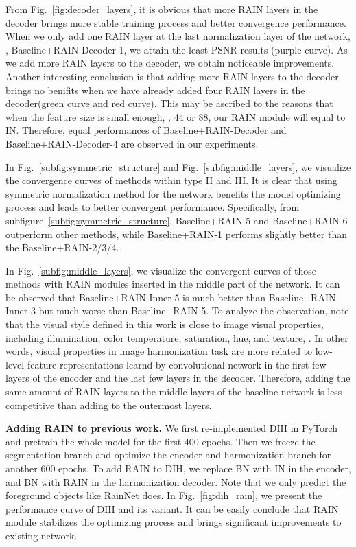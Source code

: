 \documentclass[final]{cvpr}
\begin{document}
From Fig.~\ref{fig:decoder_layers}, it is obvious that more RAIN layers in the decoder brings more stable training process and better convergence performance. When we only add one RAIN layer at the last normalization layer of the network, \ie, Baseline+RAIN-Decoder-1, we attain the least PSNR results (purple curve). As we add more RAIN layers to the decoder, we obtain noticeable improvements. Another interesting conclusion is that adding more RAIN layers to the decoder brings no benifits when we have already added four RAIN layers in the decoder(green curve and red curve). This may be ascribed to the reasons that when the feature size is small enough, \eg, 44 or 88, our RAIN module will equal to IN. Therefore, equal performances of Baseline+RAIN-Decoder and Baseline+RAIN-Decoder-4 are observed in our experiments.  

In Fig.~\ref{subfig:symmetric_structure} and Fig.~\ref{subfig:middle_layers}, we visualize the convergence curves of methods within type II and III. It is clear that using symmetric normalization method for the network benefits the model optimizing process and leads to better convergent performance. Specifically, from subfigure~\ref{subfig:symmetric_structure}, Baseline+RAIN-5 and Baseline+RAIN-6 outperform other methods, while Baseline+RAIN-1 performs slightly better than the Baseline+RAIN-2/3/4. 

In Fig.~\ref{subfig:middle_layers}, we visualize the convergent curves of those methods with RAIN modules inserted in the middle part of the network. It can be observed that Baseline+RAIN-Inner-5 is much better than Baseline+RAIN-Inner-3 but much worse than Baseline+RAIN-5. To analyze the observation, note that the visual style defined in this work is close to image visual properties, including illumination, color temperature, saturation, hue, and texture, \etc. In other words, visual properties in image harmonization task are more related to low-level feature  representations learnd by convolutional network in the first few layers of the encoder and the last few layers in the decoder. Therefore, adding the same amount of RAIN layers to the middle layers of the baseline network is less competitive than adding to the outermost layers. 



\noindent
\textbf{Adding RAIN to previous work.}
We first re-implemented DIH in PyTorch and pretrain the whole model for the first 400 epochs. Then we freeze the segmentation branch and optimize the encoder and harmonization branch for another 600 epochs. To add RAIN to DIH, we replace BN with IN in the encoder, and BN with RAIN in the harmonization decoder. Note that we only predict the foreground objects like RainNet does. In Fig.~\ref{fig:dih_rain}, we present the performance curve of DIH and its variant. It can be easily conclude that RAIN module stabilizes the optimizing process and brings significant improvements to existing network. 
\end{document}
